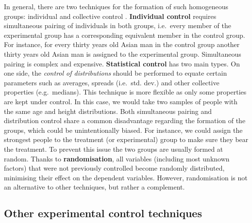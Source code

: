 \documentclass[
]{book}
\begin{document}
In general, there are two techniques for the formation of such homogeneous groups: individual and collective control \citep{bunge2017philosophy}. \textbf{Individual control} requires simultaneous pairing of individuals in both groups, i.e.~every member of the experimental group has a corresponding equivalent member in the control group. For instance, for every thirty years old Asian man in the control group another thirty years old Asian man is assigned to the experimental group. Simultaneous pairing is complex and expensive. \textbf{Statistical control} has two main types. On one side, the \emph{control of distributions} should be performed to equate certain parameters such as averages, spreads (i.e.~std. dev.) and other collective properties (e.g.~medians). This technique is more flexible as only some properties are kept under control. In this case, we would take two samples of people with the same age and height distributions. Both simultaneous pairing and distribution control share a common disadvantage regarding the formation of the groups, which could be unintentionally biased. For instance, we could assign the strongest people to the treatment (or experimental) group to make sure they bear the treatment. To prevent this issue the two groups are usually formed at random. Thanks to \textbf{randomisation}, all variables (including most unknown factors) that were not previously controlled become randomly distributed, minimising their effect on the dependent variables. However, randomisation is not an alternative to other techniques, but rather a complement.

\hypertarget{other-experimental-control-techniques}{%
\subsection{Other experimental control techniques}\label{other-experimental-control-techniques}}
\end{document}
